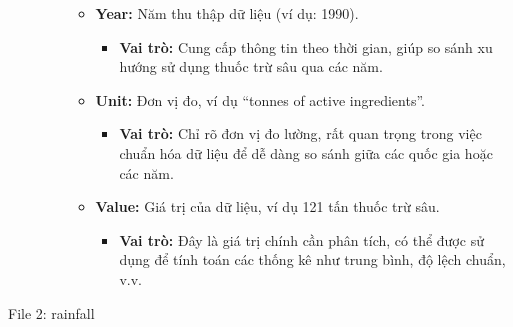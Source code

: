 \begin{description}
\begin{itemize}
\begin{itemize}
\begin{itemize}
            \end{itemize}
            \item \textbf{Year:} Năm thu thập dữ liệu (ví dụ: 1990).
            \begin{itemize}
                \item \textbf{Vai trò:} Cung cấp thông tin theo thời gian, giúp so sánh xu hướng sử dụng thuốc trừ sâu qua các năm.
            \end{itemize}
            \item \textbf{Unit:} Đơn vị đo, ví dụ ``tonnes of active ingredients''.
            \begin{itemize}
                \item \textbf{Vai trò:} Chỉ rõ đơn vị đo lường, rất quan trọng trong việc chuẩn hóa dữ liệu để dễ dàng so sánh giữa các quốc gia hoặc các năm.
            \end{itemize}
            \item \textbf{Value:} Giá trị của dữ liệu, ví dụ 121 tấn thuốc trừ sâu.
            \begin{itemize}
                \item \textbf{Vai trò:} Đây là giá trị chính cần phân tích, có thể được sử dụng để tính toán các thống kê như trung bình, độ lệch chuẩn, v.v.
            \end{itemize}
        \end{itemize}
    \end{itemize}

    \item[File 2: rainfall]


\end{description}
